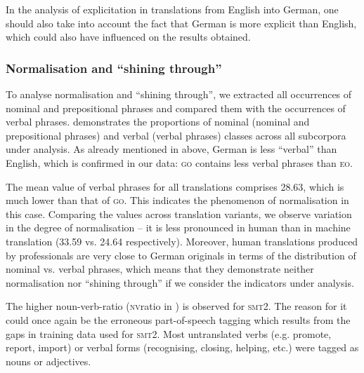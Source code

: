 \documentclass[output=paper]{LSP/langsci}
\begin{document}
In the analysis of explicitation in translations from English into German, one should also take into account the fact that German is more explicit than English, which could also have influenced on the results obtained.

\subsubsection{Normalisation and “shining through”}
 
To analyse normalisation and “shining through”, we extracted all occurrences of nominal and prepositional phrases and compared them with the occurrences of verbal phrases.  demonstrates the proportions of nominal (nominal and prepositional phrases) and verbal (verbal phrases) classes across all subcorpora under analysis. As already mentioned in  above, German is less “verbal” than English, which is confirmed in our data: \textsc{go} contains less verbal phrases than \textsc{eo}.

The mean value of verbal phrases for all translations comprises 28.63, which is much lower than that of \textsc{go}. This indicates the phenomenon of normalisation in this case. Comparing the values across translation variants, we observe variation in the degree of normalisation -- it is less pronounced in human than in machine translation (33.59 vs. 24.64 respectively).  Moreover, human translations produced by professionals are very close to German originals in terms of the distribution of nominal vs. verbal phrases, which means that they demonstrate neither normalisation nor “shining through” if we consider the indicators under analysis.

The higher noun-verb-ratio (\textsc{nv}ratio in ) is observed for \textsc{smt}2. The reason for it could once again be the erroneous part-of-speech tagging which results from the gaps in training data used for \textsc{smt}2. Most untranslated verbs (e.g. promote, report, import) or verbal forms (recognising, closing, helping, etc.) were tagged as nouns or adjectives.
\end{document}
